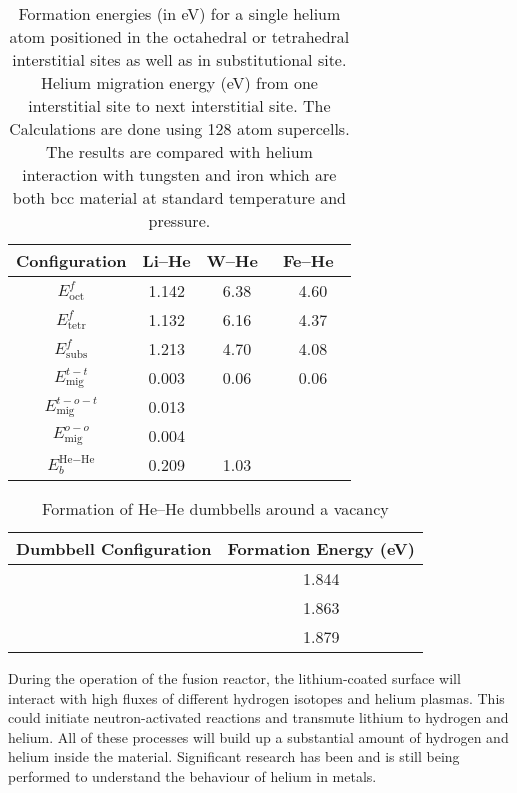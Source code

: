 \begin{table}
\caption[Formation energies (in eV) for a single helium atom positioned in the octahedral or tetrahedral interstitial sites as well as in substitutional site]{Formation energies (in eV) for a single helium atom positioned in the octahedral or tetrahedral interstitial sites as well as in substitutional site. Helium migration energy (eV) from one interstitial site to next interstitial site. The Calculations are done using 128 atom supercells. The results are compared with helium interaction with tungsten and iron which are both bcc material at standard temperature and pressure.}
\label{tab:he_li} 
\centering
\renewcommand{\arraystretch}{1.45}
\begin{tabular}{c c c c} \toprule
Configuration   & Li--He  &  W--He~\cite{becquart2007ab}   &  Fe--He~\cite{seletskaia2005magnetic} \\ \midrule
$E^{f}_{\text{oct}}$  & 1.142   &  6.38    & 4.60   \\ \hline
$E^{f}_{\text{tetr}}$ & 1.132   &  6.16    & 4.37   \\ \hline
$E^f_{\text{subs}}$          & 1.213   &  4.70    & 4.08   \\ \hline
$E^{t-t}_{\text{mig}}$       & 0.003   &  0.06    & 0.06    \\ \hline 
$E^{t-o-t}_{\text{mig}}$     & 0.013   &		   &		\\ \hline
$E^{o-o}_{\text{mig}}$		  & 0.004  &			&		\\ \hline
$E^{\text{He}-\text{He}}_b$   & 0.209  &  1.03		 &		\\ 
	\bottomrule
\end{tabular}
\end{table}

\begin{table}
\caption{Formation of  He--He dumbbells around a vacancy}
\label{tab:hedmble}
\centering
\begin{tabular}{c c} \toprule
Dumbbell Configuration & Formation Energy (eV) \\ \midrule
{}   & 1.844 \\ \hline
{}   & 1.863  \\ \hline
{}   & 1.879 \\ 
\bottomrule
\end{tabular}
\end{table}

During the operation of the fusion reactor, the lithium-coated surface will interact with high fluxes of different hydrogen isotopes and helium plasmas. This could initiate neutron-activated reactions and transmute lithium to hydrogen and helium. All of these processes will build up a substantial amount of hydrogen and helium inside the material. Significant research has been and is still being performed to understand the behaviour of helium in metals. 

